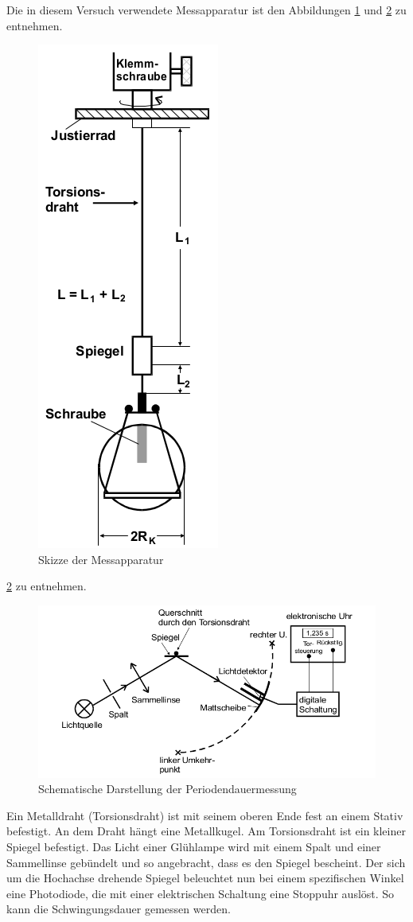 \documentclass[11pt,ngerman,a4paper]{article}
\begin{document}
Die in diesem Versuch verwendete Messapparatur ist den Abbildungen \ref{Abb2} und \ref{Abb3} zu entnehmen.
\begin{figure}[htp]
\centering
\includegraphics[scale=0.5]{Abb2.png}
\caption{Skizze der Messapparatur}
\label{Abb2}
\end{figure} 
\ref{Abb3} zu entnehmen.
\begin{figure}[htp]
\centering
\includegraphics[scale=0.6]{Abb3.png}
\caption{Schematische Darstellung der Periodendauermessung}
\label{Abb3}
\end{figure}
Ein Metalldraht (Torsionsdraht) ist mit seinem oberen Ende fest an einem Stativ befestigt. An dem Draht hängt eine Metallkugel. Am Torsionsdraht ist ein kleiner Spiegel befestigt. Das Licht einer Glühlampe wird mit einem Spalt und einer Sammellinse gebündelt und so angebracht, dass es den Spiegel bescheint. Der sich um die Hochachse drehende Spiegel beleuchtet nun bei einem spezifischen Winkel eine Photodiode, die mit einer elektrischen Schaltung eine Stoppuhr auslöst. So kann die Schwingungsdauer gemessen werden.
\end{document}
